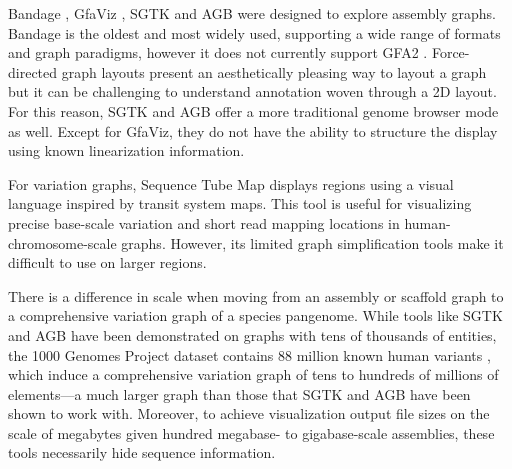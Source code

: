 Bandage \cite{Wick_2015}, GfaViz \cite{Gonnella_2018}, SGTK \cite{Kunyavskaya_2018} and AGB \cite{Mikheenko_2019} were designed to explore assembly graphs.
Bandage is the oldest and most widely used, supporting a wide range of formats and graph  paradigms, however it does not currently support GFA2 \citep{Mikheenko_2019}.
Force-directed graph layouts present an aesthetically pleasing way to layout a graph but it can be challenging to understand annotation woven through a 2D layout.
For this reason, SGTK and AGB offer a more traditional genome browser mode as well.
Except for GfaViz, they do not have the ability to structure the display using known linearization information. 


For variation graphs, Sequence Tube Map \cite{Beyer_2019} displays regions using a visual language inspired by transit system maps.
This tool is useful for visualizing precise base-scale variation and short read mapping locations in human-chromosome-scale graphs.
However, its limited graph simplification tools make it difficult to use on larger regions.

There is a difference in scale when moving from an assembly or scaffold graph to a comprehensive variation graph of a species pangenome.
While tools like SGTK and AGB have been demonstrated on graphs with tens of thousands of entities, the 1000 Genomes Project dataset contains 88 million known human variants \citep{1000_2015}, which induce a comprehensive variation graph of tens to hundreds of millions of elements---a much larger graph than those that SGTK and AGB have been shown to work with.
Moreover, to achieve visualization output file sizes on the scale of megabytes given hundred megabase- to gigabase-scale assemblies, these tools necessarily hide sequence information.


